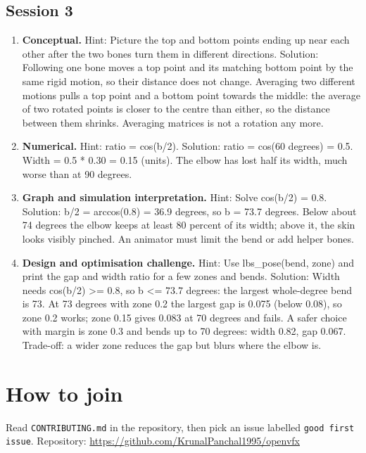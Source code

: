 \documentclass[11pt,a4paper]{article}
\begin{document}
\subsection*{Session 3}
\begin{enumerate}[nosep]
\item \textbf{Conceptual.} Hint: Picture the top and bottom points ending up near each other after the two bones turn them in different directions. Solution: Following one bone moves a top point and its matching bottom point by the same rigid motion, so their distance does not change. Averaging two different motions pulls a top point and a bottom point towards the middle: the average of two rotated points is closer to the centre than either, so the distance between them shrinks. Averaging matrices is not a rotation any more.
\item \textbf{Numerical.} Hint: ratio = cos(b/2). Solution: ratio = cos(60 degrees) = 0.5. Width = 0.5 * 0.30 = 0.15 (units). The elbow has lost half its width, much worse than at 90 degrees.
\item \textbf{Graph and simulation interpretation.} Hint: Solve cos(b/2) = 0.8. Solution: b/2 = arccos(0.8) = 36.9 degrees, so b = 73.7 degrees. Below about 74 degrees the elbow keeps at least 80 percent of its width; above it, the skin looks visibly pinched. An animator must limit the bend or add helper bones.
\item \textbf{Design and optimisation challenge.} Hint: Use lbs\_pose(bend, zone) and print the gap and width ratio for a few zones and bends. Solution: Width needs cos(b/2) \textgreater{}= 0.8, so b \textless{}= 73.7 degrees: the largest whole-degree bend is 73. At 73 degrees with zone 0.2 the largest gap is 0.075 (below 0.08), so zone 0.2 works; zone 0.15 gives 0.083 at 70 degrees and fails. A safer choice with margin is zone 0.3 and bends up to 70 degrees: width 0.82, gap 0.067. Trade-off: a wider zone reduces the gap but blurs where the elbow is.
\end{enumerate}

\section{How to join}
Read \texttt{CONTRIBUTING.md} in the repository, then pick an issue labelled \texttt{good first issue}. Repository: \url{https://github.com/KrunalPanchal1995/openvfx}
\end{document}
